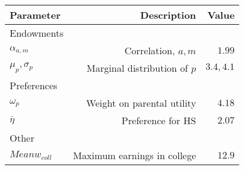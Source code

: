\begin{tabular}{lrr}
\hline
Parameter & Description  & Value  \\
\hline
Endowments &   &   \\
$\alpha_{a,m}$ & Correlation, $a,m$  & $1.99$  \\
$\mu_{p}, \sigma_{p}$ & Marginal distribution of $p$  & $3.4, 4.1$  \\
Preferences &   &   \\
$\omega_{p}$ & Weight on parental utility  & $4.18$  \\
$\bar{\eta}$ & Preference for HS  & $2.07$  \\
Other &   &   \\
$Mean w_{coll}$ & Maximum earnings in college  & $12.9$  \\
\hline
\end{tabular}%
